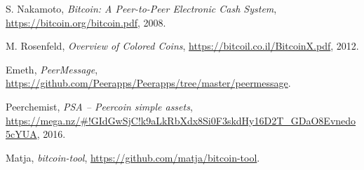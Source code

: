 \documentclass[a4paper,10pt]{article}
\begin{document}
\begin{thebibliography}{9}

  S. Nakamoto,
  \emph{Bitcoin: A Peer-to-Peer Electronic Cash System},
  \url{https://bitcoin.org/bitcoin.pdf},
  2008.

  M. Rosenfeld,
  \emph{Overview of Colored Coins},
  \url{https://bitcoil.co.il/BitcoinX.pdf},
  2012.

  Emeth,
  \emph{PeerMessage},
  \url{https://github.com/Peerapps/Peerapps/tree/master/peermessage}.

  Peerchemist,
  \emph{PSA – Peercoin simple assets},
  \url{https://mega.nz/#!GIdGwSjC!k9aLkRbXdx8Si0F3skdHy16D2T_GDaO8Evnedo5cYUA},
  2016.

  Matja,
  \emph{bitcoin-tool},
  \url{https://github.com/matja/bitcoin-tool}.

\end{thebibliography}
\end{document}
